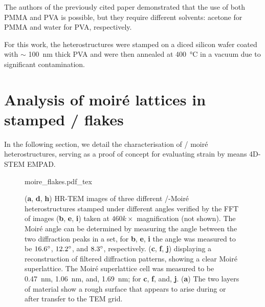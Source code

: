 The authors of the previously cited paper demonstrated that the use of both PMMA and PVA is possible, but they require different solvents: acetone for PMMA and water for PVA, respectively.

For this work, the heterostructures were stamped on a diced silicon wafer coated with \(\sim \) \SI{100}{\nm} thick PVA and were then annealed at \SI{400}{\degreeCelsius} in a vacuum due to significant contamination.


\section{Analysis of moiré lattices in stamped /\- flakes}
\label{sec:results}



In the following section, we detail the characterisation of /\- moiré heterostructures, serving as a proof of concept for evaluating strain by means 4D-STEM EMPAD.

\begin{figure}
    \centering
    \def\svgwidth{.9\linewidth}
    {moire_flakes.pdf_tex}
    \caption{(\textbf{a}, \textbf{d}, \textbf{h}) HR-TEM images of three different /\--Moiré heterostructures stamped under different angles verified by the FFT of images (\textbf{b}, \textbf{e}, \textbf{i}) taken at $460k\times$ magnification (not shown). The Moiré angle can be determined by measuring the angle between the two diffraction peaks in a set, for \textbf{b}, \textbf{e}, \textbf{i} the angle was measured to be $16.6\degree$, $12.2\degree$, and $8.3\degree$, respectively. (\textbf{c}, \textbf{f}, \textbf{j}) displaying a reconstruction of filtered diffraction patterns, showing a clear Moiré superlattice. The Moiré superlattice cell was measured to be \SI{0.47}{nm}, \SI{1.06}{nm}, and, \SI{1.69}{nm}; for \textbf{c}, \textbf{f}, and, \textbf{j}. (\textbf{a}) The two layers of material show a rough surface that appears to arise during or after transfer to the TEM grid.}
    \label{fig:moire_overview}
\end{figure}


